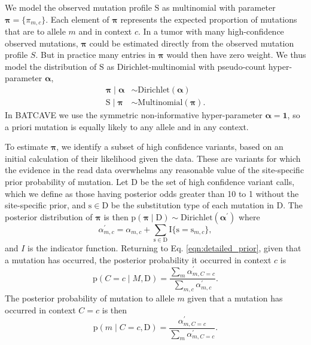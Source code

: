 \documentclass[a4,center,fleqn]{NAR}
\newcommand{\batcave}{BATCAVE\xspace}
\begin{document}
We model the observed mutation profile $\mathrm{S}$ as multinomial with parameter $\boldsymbol{\pi} = \{\pi_{m,c}\}$.
Each element of $\boldsymbol{\pi}$ represents the expected proportion of mutations that are to allele $m$ and in context $c$.
In a tumor with many high-confidence observed mutations, $\boldsymbol{\pi}$ could be estimated directly from the observed mutation profile $S$.
But in practice many entries in $\boldsymbol{\pi}$ would then have zero weight.
We thus model the distribution of $\mathrm{S}$ as Dirichlet-multinomial with pseudo-count hyper-parameter $\boldsymbol{\alpha}$, 
\begin{equation}
\begin{aligned}
  \boldsymbol{\pi} \mid \boldsymbol{\alpha} &\sim \textrm{Dirichlet}(\boldsymbol{\alpha}) \\
  \mathrm{S} \mid \boldsymbol{\pi} & \sim \textrm{Multinomial}(\boldsymbol{\pi}).
\end{aligned}
\end{equation}
In \batcave we use the symmetric non-informative hyper-parameter $\boldsymbol{\alpha} = \boldsymbol{1}$, so a priori mutation is equally likely to any allele and in any context.

To estimate $\boldsymbol{\pi}$, we identify a subset of high confidence variants, based on an initial calculation of their likelihood given the data.
These are variants for which the evidence in the read data overwhelms any reasonable value of the site-specific prior probability of mutation.
Let $\mathrm{D}$ be the set of high confidence variant calls, which we define as those having posterior odds greater than 10 to 1 without the site-specific prior, and $\mathrm{s} \in \mathrm{D}$ be the substitution type of each mutation in $\mathrm{D}$.
The posterior distribution of $\boldsymbol{\pi}$ is then $\mathrm{p}(\boldsymbol{\pi} \mid \mathrm{D}) \sim \textrm{Dirichlet}(\boldsymbol{\alpha^{\prime}})$ where
\begin{equation}
    \alpha^{\prime}_{m,c} = \alpha_{m,c} + \sum\limits_{\mathrm{s} \in \mathrm{D}} \mathrm{I}\{\mathrm{s} = \mathrm{s}_{m,c}\},
\end{equation}
and $I$ is the indicator function.
Returning to Eq. \ref{eqn:detailed_prior}, given that a mutation has occurred, the posterior probability it occurred in context $c$ is
\begin{equation}
  \label{eqn:post_pred}
  \mathrm{p}(C = c \mid M,\mathrm{D}) = \frac{\sum_{m}\alpha^{\prime}_{m,C = c}}{\sum_{m,c}\alpha^{\prime}_{m,c}}.
\end{equation}
The posterior probability of mutation to allele $m$ given that a mutation has occurred in context $C = c$ is then
\begin{equation}
  \label{eqn:to_allele}
   \mathrm{p}(m \mid C = c,\mathrm{D}) = \frac{\alpha^{\prime}_{m,C=c}}{\sum_{m} \alpha^{\prime}_{m,C = c}}.
\end{equation}
\end{document}
